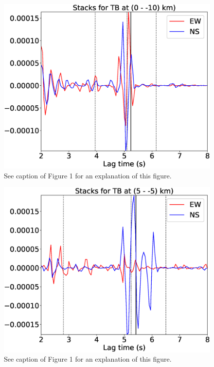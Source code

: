 \documentclass[letterpaper, 12pt]{article}
\begin{document}
\begin{figure}[H]
\includegraphics[width=\linewidth]{figures/intervals/TB_000_-10_stacks.eps}
\caption{See caption of Figure 1 for an explanation of this figure.}
\end{figure}

\begin{figure}[H]
\includegraphics[width=\linewidth]{figures/intervals/TB_005_-05_stacks.eps}
\caption{See caption of Figure 1 for an explanation of this figure.}
\end{figure}
\end{document}
